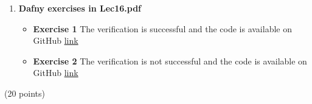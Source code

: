 \documentclass[11pt]{article}
\begin{document}
\begin{compactenum}
\begin{minipage}{\minpagw}
{{\begin{enumerate}
\begin{enumerate}
\begin{itemize}
\begin{itemize}
                    \end{itemize}
                \end{itemize}
          \end{enumerate}
          \item \textbf{Dafny exercises in Lec16.pdf}
          \begin{itemize}
              \item \textbf{Exercise 1} The verification is successful and the code is available on GitHub \href{https://github.com/tripti-agarwal/Formal-Method-verification/blob/main/Assignment6/Ex1.dfy}{link}
              \item \textbf{Exercise 2}
               The verification is not successful and the code is available on GitHub \href{https://github.com/tripti-agarwal/Formal-Method-verification/blob/main/Assignment6/Ex2.dfy}{link}
          \end{itemize}
      \end{enumerate}
    }%
  }%
\end{minipage}
\newpage
\item (20 points)
 

\end{compactenum}
\end{document}
